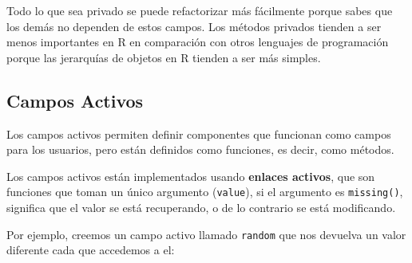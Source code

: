 \documentclass[
]{book}
\newenvironment{Shaded}{\begin{snugshade}}{\end{snugshade}}
\newcommand{\AttributeTok}[1]{\textcolor[rgb]{0.13,0.29,0.53}{#1}}
\newcommand{\ConstantTok}[1]{\textcolor[rgb]{0.56,0.35,0.01}{#1}}
\newcommand{\ControlFlowTok}[1]{\textcolor[rgb]{0.13,0.29,0.53}{\textbf{#1}}}
\newcommand{\DecValTok}[1]{\textcolor[rgb]{0.00,0.00,0.81}{#1}}
\newcommand{\DocumentationTok}[1]{\textcolor[rgb]{0.56,0.35,0.01}{\textbf{\textit{#1}}}}
\newcommand{\FunctionTok}[1]{\textcolor[rgb]{0.13,0.29,0.53}{\textbf{#1}}}
\newcommand{\NormalTok}[1]{#1}
\newcommand{\OtherTok}[1]{\textcolor[rgb]{0.56,0.35,0.01}{#1}}
\newcommand{\SpecialCharTok}[1]{\textcolor[rgb]{0.81,0.36,0.00}{\textbf{#1}}}
\newcommand{\StringTok}[1]{\textcolor[rgb]{0.31,0.60,0.02}{#1}}
\begin{document}
Todo lo que sea privado se puede refactorizar más fácilmente porque sabes que los demás no dependen de estos campos. Los métodos privados tienden a ser menos importantes en R en comparación con otros lenguajes de programación porque las jerarquías de objetos en R tienden a ser más simples.

\hypertarget{campos-activos}{%
\subsection{Campos Activos}\label{campos-activos}}

Los campos activos permiten definir componentes que funcionan como campos para los usuarios, pero están definidos como funciones, es decir, como métodos.

Los campos activos están implementados usando \textbf{enlaces activos}, que son funciones que toman un único argumento (\texttt{value}), si el argumento es \texttt{missing()}, significa que el valor se está recuperando, o de lo contrario se está modificando.

Por ejemplo, creemos un campo activo llamado \texttt{random} que nos devuelva un valor diferente cada que accedemos a el:

\begin{Shaded}
\end{Shaded}
\end{document}
